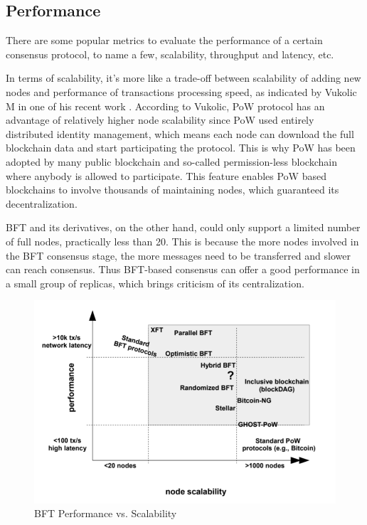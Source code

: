 \subsection{Performance}

There are some popular metrics to evaluate the performance of a certain consensus protocol, to name a few, scalability, throughput and latency, etc.

In terms of scalability, it's more like a trade-off between scalability of adding new nodes and performance of transactions processing speed, as indicated by Vukolic M in one of his recent work \cite{bft_perf}. According to Vukolic, PoW protocol has an advantage of relatively higher node scalability since PoW used entirely distributed identity management, which means each node can download the full blockchain data and start participating the protocol. This is why PoW has been adopted by many public blockchain and so-called permission-less blockchain where anybody is allowed to participate. This feature enables PoW based blockchains to involve thousands of maintaining nodes, which guaranteed its decentralization. 

BFT and its derivatives, on the other hand, could only support a limited number of full nodes, practically less than 20. This is because the more nodes involved in the BFT consensus stage, the more messages need to be transferred and slower can reach consensus. Thus BFT-based consensus can offer a good performance in a small group of replicas, which brings criticism of its centralization.

\begin{figure}
\centering
\includegraphics[width=  \linewidth]{bft_perf.png}
\caption{BFT Performance vs. Scalability}
\label{fig:bft_perf}
\end{figure}   

